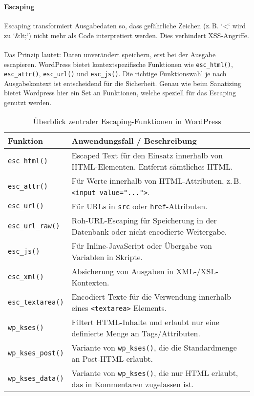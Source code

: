 \newpage

\textbf{Escaping}\\\\
Escaping transformiert Ausgabedaten so, dass gefährliche Zeichen (z.\,B. `<` wird zu `\&lt;`) nicht mehr als Code interpretiert werden. Dies verhindert XSS-Angriffe.\\\\
Das Prinzip lautet: Daten unverändert speichern, erst bei der Ausgabe escapieren. WordPress bietet kontextspezifische Funktionen wie \texttt{esc\_html()}, \texttt{esc\_attr()}, \texttt{esc\_url()} und \texttt{esc\_js()}.
Die richtige Funktionswahl je nach Ausgabekontext ist entscheidend für die Sicherheit.
Genau wie beim Sanatizing bietet Wordpress hier ein Set an Funktionen, welche speziell für das Escaping genutzt werden.

\begin{table}[h]
 \centering
 \begin{tabular}{|l|p{9cm}|}
  \hline
  \textbf{Funktion} & \textbf{Anwendungsfall / Beschreibung} \\
  \hline
  \texttt{esc\_html()} & Escaped Text für den Einsatz innerhalb von HTML-Elementen. Entfernt sämtliches HTML. \\
  \hline
  \texttt{esc\_attr()} & Für Werte innerhalb von HTML-Attributen, z.\,B. \texttt{<input value="...">}. \\
  \hline
  \texttt{esc\_url()} & Für URLs in \texttt{src} oder \texttt{href}-Attributen. \\
  \hline
  \texttt{esc\_url\_raw()} & Roh-URL-Escaping für Speicherung in der Datenbank oder nicht-encodierte Weitergabe. \\
  \hline
  \texttt{esc\_js()} & Für Inline-JavaScript oder Übergabe von Variablen in Skripte. \\
  \hline
  \texttt{esc\_xml()} & Absicherung von Ausgaben in XML-/XSL-Kontexten. \\
  \hline
  \texttt{esc\_textarea()} & Encodiert Texte für die Verwendung innerhalb eines \texttt{<textarea>} Elements. \\
  \hline
  \texttt{wp\_kses()} & Filtert HTML-Inhalte und erlaubt nur eine definierte Menge an Tags/Attributen. \\
  \hline
  \texttt{wp\_kses\_post()} & Variante von \texttt{wp\_kses()}, die die Standardmenge an Post-HTML erlaubt. \\
  \hline
  \texttt{wp\_kses\_data()} & Variante von \texttt{wp\_kses()}, die nur HTML erlaubt, das in Kommentaren zugelassen ist. \\
  \hline
 \end{tabular}
 \caption{Überblick zentraler Escaping-Funktionen in WordPress}
 \label{tab:escaping}
\end{table}

